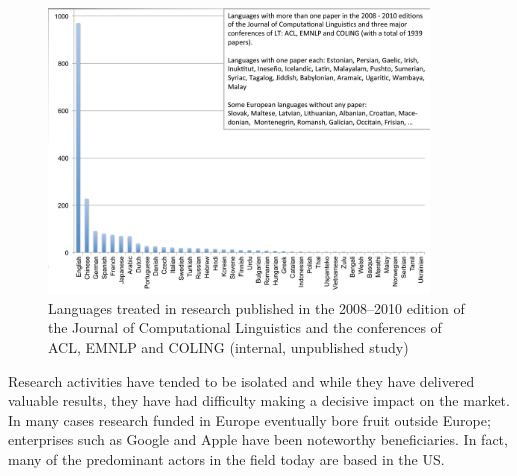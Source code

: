 \documentclass[10pt, plain]{../../metanetpaper}
\begin{document}
\begin{multicols}{2}
\begin{figure}[htb]
  \center
  \includegraphics[width=0.90\textwidth]{../_media/Languages-in-LT-Research-CMYK}
  \caption{Languages treated in research published in the 2008--2010 edition of the Journal of Computational Linguistics and the conferences of ACL, EMNLP and COLING (internal, unpublished study)}
  \label{fig:languages-in-research}
\end{figure}

Research activities have tended to be isolated and while they have delivered valuable results, they have had difficulty making a decisive impact on the market. In many cases research funded in Europe eventually bore fruit outside Europe; enterprises such as Google and Apple have been noteworthy beneficiaries. In fact, many of the predominant actors in the field today are based in the US.

%
%
%
%


\end{multicols}
\end{document}
